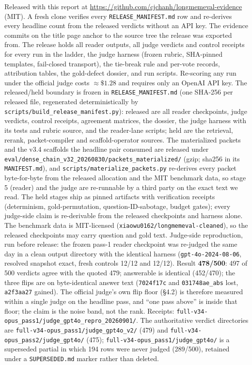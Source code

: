 \documentclass[11pt]{article}
\begin{document}
Released with this report at
\url{https://github.com/cjchanh/longmemeval-evidence} (MIT). A fresh clone
verifies every \texttt{RELEASE\_MANIFEST.md} row and re-derives every headline count from the
released verdicts without an API key. The evidence commits on the title page
anchor to the source tree the release was exported from. The release holds all reader outputs, all judge verdicts and
control receipts for every run in the ladder, the judge harness (frozen rubric, SHA-pinned
templates, fail-closed transport), the tie-break rule and per-vote records,
attribution tables, the gold-defect dossier, and run scripts. Re-scoring any
run under the official judge costs $\approx\$1.28$ and requires only an OpenAI
API key. The released/held boundary is frozen in
\texttt{RELEASE\_MANIFEST.md} (one SHA-256 per released file, regenerated
deterministically by \texttt{scripts/build\_release\_manifest.py}):
released are all reader checkpoints, judge verdicts, control receipts,
agreement matrices, the dossier, the judge harness with its tests and rubric
source, and the reader-lane scripts; held are the retrieval, rerank,
packet-compiler and scaffold-operator sources. The materialized packets and
the v3.4 scaffolds the headline pair consumed are released under
\texttt{eval/dense\_chain\_v32\_20260830/packets\_materialized/} (gzip; sha256
in its \texttt{MANIFEST.md}), and \texttt{scripts/materialize\_packets.py}
re-derives every packet byte-for-byte from the released allocation and the
MIT benchmark data, so stage 5 (reader) and the judge are re-runnable by a
third party on the exact text we read. The held stages ship as pinned
artifacts with
verification receipts (determinism, gold-permutation, question-ID-sabotage,
budget gates); every judge-side claim is re-derivable from the released
checkpoints and harness alone. The benchmark data is MIT-licensed
(\texttt{xiaowu0162/longmemeval-cleaned}), so the released checkpoints may
carry question and gold text.
Judge-side reproduction, run before release: the frozen pass-1 reader
checkpoint was re-judged the same day in a clean output directory with the
identical harness (\texttt{gpt-4o-2024-08-06}, resolved snapshot exact, fresh
controls 12/12 and 12/12). Result \textbf{478/500}: 497 of 500 verdicts agree
with the quoted 479; answerable is identical (452/470); the three flips are
on byte-identical answer text (\texttt{7024f17c} and \texttt{031748ae\_abs}
lost, \texttt{a2f3aa27} gained). The official judge's own flip floor (\S4.2)
is therefore measured within a single judge on the headline pass, and
``one pass above'' is inside that floor; the claim is the noise band, not the
rank. Receipts:
\texttt{full-v34-opus\_pass1/judge\_gpt4o\_repro\_20260901/}. The authoritative
verdict directories are \texttt{full-v34-opus\_pass1/judge\_gpt4o\_v2/} (479) and
\texttt{full-v34-opus\_pass2/judge\_gpt4o/} (475);
\texttt{full-v34-opus\_pass1/judge\_gpt4o/} is a superseded partial in which 194
rows were never judged (289/500), retained under a \texttt{SUPERSEDED.md} marker
rather than deleted.
\end{document}
